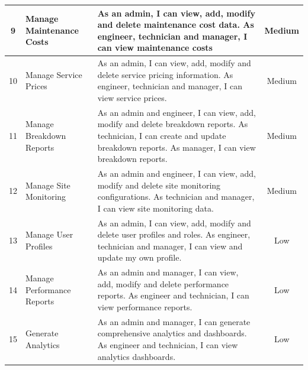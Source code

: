 \begin{longtable}{|c|p{4cm}|p{7cm}|c|}
9 & Manage Maintenance Costs & As an admin, I can view, add, modify and delete maintenance cost data.\vspace{0.25cm}  \newline As engineer, technician and manager, I can view maintenance costs & Medium \\ \hline
10 & Manage Service Prices & As an admin, I can view, add, modify and delete service pricing information.\vspace{0.25cm} \newline As engineer, technician and manager, I can view service prices. & Medium \\ \hline
11 & Manage Breakdown Reports & As an admin and engineer, I can view, add, modify and delete breakdown reports.\vspace{0.25cm}  \newline As technician, I can create and update breakdown reports. As manager, I can view breakdown reports. & Medium \\ \hline
12 & Manage Site Monitoring & As an admin and engineer, I can view, add, modify and delete site monitoring configurations.\vspace{0.25cm} \newline  As technician and manager, I can view site monitoring data. & Medium \\ \hline
13 & Manage User Profiles & As an admin, I can view, add, modify and delete user profiles and roles.\vspace{0.25cm} \newline As engineer, technician and manager, I can view and update my own profile. & Low \\ \hline
14 & Manage Performance Reports & As an admin and manager, I can view, add, modify and delete performance reports.\vspace{0.25cm} \newline  As engineer and technician, I can view performance reports. & Low \\ \hline
15 & Generate Analytics & As an admin and manager, I can generate comprehensive analytics and dashboards.\vspace{0.25cm} \newline As engineer and technician, I can view analytics dashboards. & Low \\ \hline
\end{longtable} \newline

